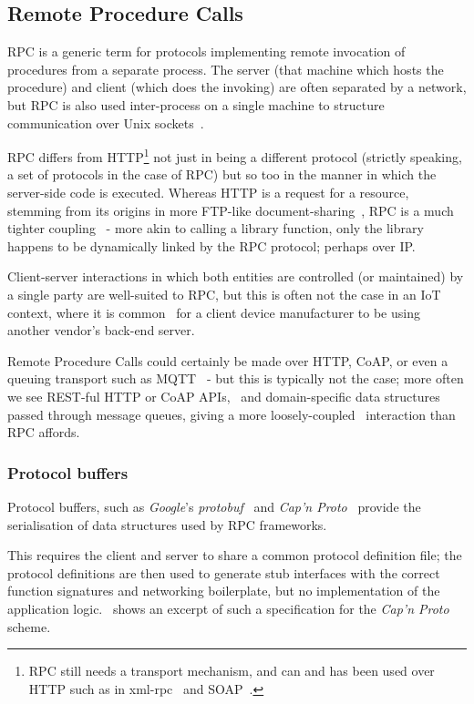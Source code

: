 \subsection{Remote Procedure Calls} \label{soln:rpc}
RPC is a generic term for protocols implementing remote invocation of procedures from a separate process. The server (that machine which hosts the procedure) and client (which does the invoking) are often separated by a network, but RPC is also used inter-process on a single machine to structure communication over Unix sockets~\cite{rpc_unix_sockets}.

RPC differs from HTTP\footnote{RPC still needs a transport mechanism, and can and has been used over HTTP such as in xml-rpc~\cite{xml-rpc} and SOAP~\cite{ietf-soap-draft}.} not just in being a different protocol (strictly speaking, a set of protocols in the case of RPC) but so too in the manner in which the server-side code is executed. Whereas HTTP is a request for a resource, stemming from its origins in more FTP-like document-sharing~\cite{http_history, http_vs_ftp}, RPC is a much tighter coupling~\cite{client_server_coupling} - more akin to calling a library function, only the library happens to be dynamically linked by the RPC protocol; perhaps over IP.

Client-server interactions in which both entities are controlled (or maintained) by a single party are well-suited to RPC, but this is often not the case in an IoT context, where it is common~\cite{apis_power_iot} for a client device manufacturer to be using another vendor's back-end server.

Remote Procedure Calls could certainly be made over HTTP, CoAP, or even a queuing transport such as MQTT~\cite{mqtt-rpc} - but this is typically not the case; more often we see REST-ful HTTP or CoAP APIs,~ and domain-specific data structures passed through message queues, giving a more loosely-coupled~\cite{client_server_coupling} interaction than RPC affords.

\subsubsection{Protocol buffers} \label{soln:rpc:protocol-buffers}

Protocol buffers, such as \emph{Google}'s \emph{protobuf}~\cite{protobuf} and \emph{Cap'n Proto}~\cite{capn_proto} provide the serialisation of data structures used by RPC frameworks.

This requires the client and server to share a common protocol definition file; the protocol definitions are then used to generate stub interfaces with the correct function signatures and networking boilerplate, but no implementation of the application logic.~\cite{networks_distributed_systems}  shows an excerpt of such a specification for the \emph{Cap'n Proto} scheme.

